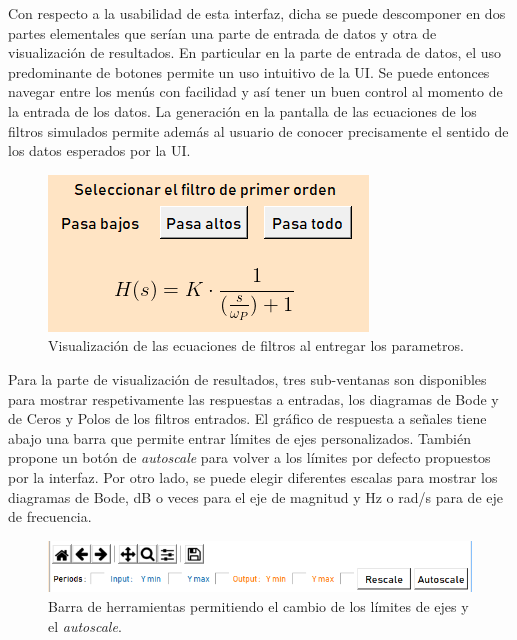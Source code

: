 \documentclass[a4paper]{article}
\begin{document}
Con respecto a la usabilidad de esta interfaz, dicha se puede descomponer en dos partes elementales que serían una parte de entrada de datos y otra de visualización de resultados. En particular en la parte de entrada de datos, el uso predominante de botones permite un uso intuitivo de la UI. Se puede entonces navegar entre los menús con 
facilidad y así tener un buen control al momento de la entrada de los datos. La generación en la pantalla de las ecuaciones de los filtros simulados permite además al usuario de conocer precisamente el sentido de los datos esperados por la UI.

\begin{figure}[h]
\begin{center}
\includegraphics[scale=0.6]{EcuacionUI}
\caption{Visualización de las ecuaciones de filtros al entregar los parametros.}
\end{center}
\end{figure}

Para la parte de visualización de resultados, tres sub-ventanas son disponibles para mostrar respetivamente las respuestas a entradas, los diagramas de Bode y de Ceros y Polos de los filtros entrados.
El gráfico de respuesta a señales tiene abajo una barra que permite entrar límites de ejes personalizados. También propone un botón de \textit{autoscale} para volver a los límites por defecto propuestos por la interfaz. Por otro lado, se puede elegir diferentes escalas para mostrar los diagramas de Bode, dB o veces para el eje de magnitud y Hz o rad/s para de eje de frecuencia.

\begin{figure}[h]
\begin{center}
\includegraphics[scale=0.7]{RescaleUI}
\caption{Barra de herramientas permitiendo el cambio de los límites de ejes y el \textit{autoscale}.}
\end{center}
\end{figure}
\end{document}

